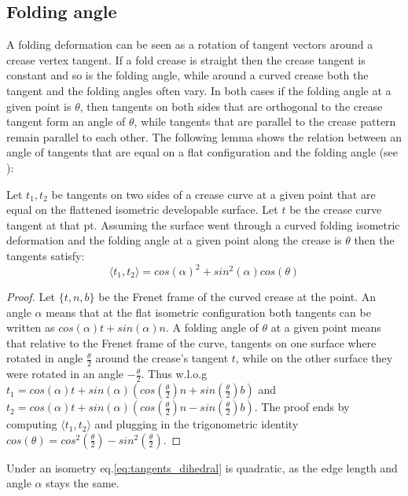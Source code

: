 \subsection{Folding angle} A folding deformation can be seen as a rotation of tangent vectors around a crease vertex tangent. If a fold crease is straight then the crease tangent is constant and so is the folding angle, while around a curved crease both the tangent and the folding angles often vary. In both cases if the folding angle at a given point is $\theta$, then tangents on both sides that are orthogonal to the crease tangent form an angle of $\theta$, while tangents that are parallel to the crease pattern remain parallel to each other. The following lemma shows the relation between an angle of tangents that are equal on a flat configuration and the folding angle (see ): 
 \begin{lemma}  \label{lem:tangents_dihedral}
 Let $t_1,t_2$ be tangents on two sides of a crease curve at a given point that are equal on the flattened isometric developable surface. Let $t$ be the crease curve tangent at that pt. Assuming the surface went through a curved folding isometric deformation and the folding angle at a given point along the crease is $\theta$ then the tangents satisfy:
\begin{equation} \label{eq:tangents_dihedral}
\langle t_1, t_2 \rangle = cos(\alpha)^2 + sin^2(\alpha) cos(\theta) \end{equation}
\end{lemma}
\begin{proof}{Let $\{t,n,b\}$ be the Frenet frame of the curved crease at the point. An angle $\alpha$ means that at the flat isometric configuration both tangents can be written as $cos(\alpha)t + sin(\alpha)n$. A folding angle of $\theta$ at a given point means that relative to the Frenet frame of the curve, tangents on one surface where rotated in angle $\frac{\theta}{2}$ around the crease's tangent $t$, while on the other surface they were rotated in an angle  $-\frac{\theta}{2}$. Thus w.l.o.g $t_1 = cos(\alpha)t + sin(\alpha)(cos(\frac{\theta}{2})n+sin(\frac{\theta}{2})b)$ and $t_2 = cos(\alpha)t + sin(\alpha)(cos(\frac{\theta}{2})n-sin(\frac{\theta}{2})b)$. The proof ends by computing $\langle t_1,t_2 \rangle$ and plugging in the trigonometric identity $cos(\theta) = cos^2(\frac{\theta}{2})-sin^2(\frac{\theta}{2})$.}\end{proof}

Under an isometry eq.\eqref{eq:tangents_dihedral} is quadratic, as the edge length and angle $\alpha$ stays the same.

